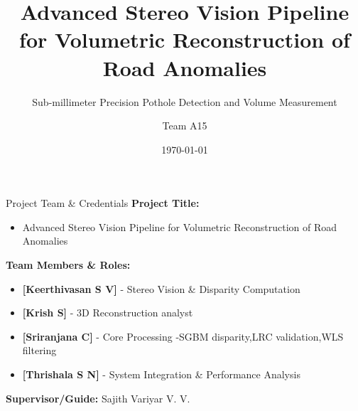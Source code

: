 \documentclass[aspectratio=169]{beamer}
\title[Road Anomaly 3D Reconstruction]{Advanced Stereo Vision Pipeline for Volumetric Reconstruction of Road Anomalies}
\subtitle{Sub-millimeter Precision Pothole Detection and Volume Measurement}
\author{Team A15}
\institute{Amrita Vishwa Vidhyapeetham \\ [AIE "A"]}
\date{\today}
\begin{document}
\begin{frame}
\titlepage
\end{frame}

\begin{frame}{Project Team \& Credentials}
\textbf{Project Title:}
\begin{itemize}
\item Advanced Stereo Vision Pipeline for Volumetric Reconstruction of Road Anomalies
\end{itemize}

\vspace{0.5cm}

\textbf{Team Members \& Roles:}
\begin{itemize}
\item \textbf{[Keerthivasan S V]} - Stereo Vision \& Disparity Computation
\item \textbf{[Krish S]} - 3D Reconstruction analyst
\item \textbf{[Sriranjana C]} - Core Processing -SGBM disparity,LRC validation,WLS filtering 
\item \textbf{[Thrishala S N]} - System Integration \& Performance Analysis
\end{itemize}

\vspace{0.5cm}

\textbf{Supervisor/Guide:} Sajith Variyar V. V.
\end{frame}
\end{document}
